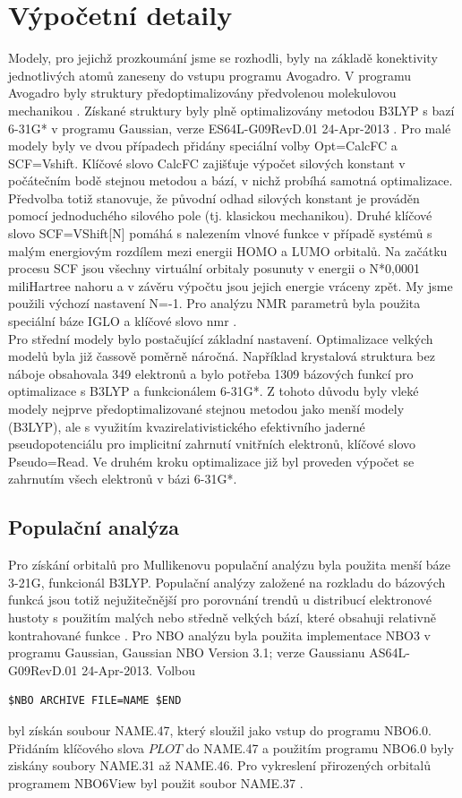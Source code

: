 \documentclass[
  digital, %
  table,   %
  lof,     %
  lot,     %
  oneside,
]{fithesis3}
\begin{document}
\section{Výpočetní detaily}
Modely, pro jejichž prozkoumání jsme se rozhodli, byly na základě konektivity jednotlivých atomů zaneseny do vstupu programu Avogadro. V programu Avogadro byly struktury předoptimalizovány předvolenou molekulovou mechanikou \cite{Avogadro}. Získané struktury byly plně optimalizovány metodou B3LYP \cite{b3lyp} s bazí 6-31G* v programu Gaussian, verze ES64L-G09RevD.01 24-Apr-2013  \cite{g09}. Pro malé modely byly ve dvou případech přidány speciální volby Opt=CalcFC a SCF=Vshift. Klíčové slovo CalcFC zajišťuje výpočet silových konstant v počátečním bodě stejnou metodou a bází, v nichž probíhá samotná optimalizace. Předvolba totiž stanovuje, že původní odhad silových konstant je prováděn pomocí jednoduchého silového pole (tj. klasickou mechanikou). Druhé klíčové slovo SCF=VShift[N] pomáhá s nalezením vlnové funkce v případě systémů s malým energiovým rozdílem mezi energii HOMO a LUMO orbitalů. Na začátku procesu SCF jsou všechny virtuální orbitaly posunuty v energii o N*0,0001 miliHartree nahoru a v závěru výpočtu jsou jejich energie vráceny zpět. My jsme použili výchozí nastavení N=-1. Pro analýzu NMR parametrů byla použita speciální báze IGLO \cite{iglo} a klíčové slovo nmr \cite{g09}. \\
Pro střední modely bylo postačující základní nastavení. Optimalizace velkých modelů byla již čassově poměrně náročná. Například krystalová struktura bez náboje obsahovala 349 elektronů a bylo potřeba 1309 bázových funkcí pro optimalizace s B3LYP a funkcionálem 6-31G*. Z tohoto důvodu byly vleké modely nejprve předoptimalizované stejnou metodou jako menší modely (B3LYP), ale s využitím kvazirelativistického efektivního jaderné pseudopotenciálu pro implicitní zahrnutí vnitřních elektronů, klíčové slovo Pseudo=Read. Ve druhém kroku optimalizace již byl proveden výpočet se zahrnutím všech elektronů v bázi 6-31G*.\\
\subsection{Populační analýza}
Pro získání orbitalů pro Mullikenovu populační analýzu byla použita menší báze 3-21G, funkcionál B3LYP. Populační analýzy založené na rozkladu do bázových funkcá jsou totiž nejužitečnější pro porovnání trendů u distribucí elektronové hustoty s použitím malých nebo středně velkých bází, které obsahuji relativně kontrahované funkce \cite{jensen2007introduction}.
 Pro NBO analýzu byla použita implementace NBO3 v programu Gaussian, Gaussian NBO Version 3.1; verze Gaussianu AS64L-G09RevD.01 24-Apr-2013. Volbou  \begin{lstlisting}[frame=single]
 $NBO ARCHIVE FILE=NAME $END
  \end{lstlisting}
byl získán soubour NAME.47, který sloužil jako vstup do programu NBO6.0. Přidáním klíčového slova $PLOT$ do NAME.47 a použitím programu NBO6.0 byly ziskány soubory NAME.31 až NAME.46. Pro vykreslení přirozených orbitalů programem NBO6View byl použit soubor NAME.37 \cite{doi:10.1002/jcc.23266}.
\end{document}
